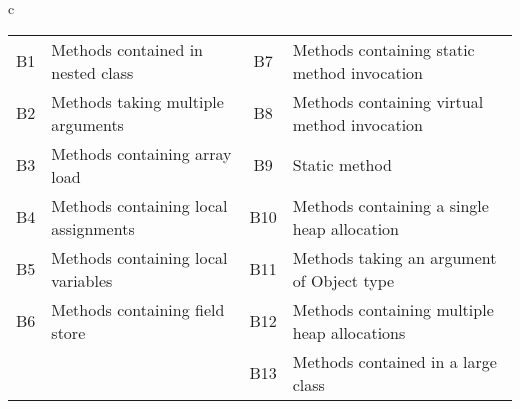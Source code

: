\begin{table}[t]
\begin{tabular}{c}
\begin{tabular}{clcl}
 B1 & Methods contained in nested class  			& B7 & Methods containing static method invocation\\
 B2 & Methods taking multiple arguments 			& B8 & Methods containing virtual method invocation\\
 B3 & Methods containing array load 				& B9 & Static method \\
 B4 & Methods containing local assignments 			& B10 & Methods containing a single heap allocation \\
 B5 & Methods containing local variables 			& B11 & Methods taking an argument of Object type \\
 B6 & Methods containing field store 				& B12 & Methods containing multiple heap allocations \\
 & & B13 & Methods contained in a large class\\

        \bottomrule
    \end{tabular}
\end{tabular}
\end{table}


